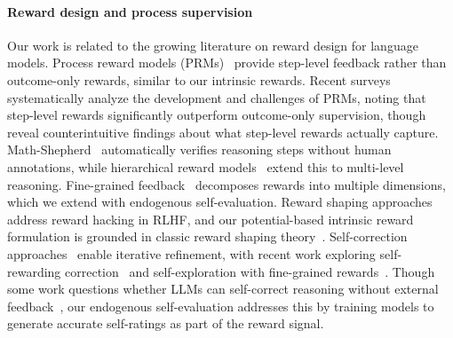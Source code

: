 \documentclass{article}
\theoremstyle{plain}
\theoremstyle{definition}
\theoremstyle{remark}
\begin{document}
\paragraph{Reward design and process supervision} Our work is related to the growing literature on reward design for language models. Process reward models (PRMs)~\citep{lightman2023letsverifystepstep, uesato2022solving, luo2024improve} provide step-level feedback rather than outcome-only rewards, similar to our intrinsic rewards. Recent surveys~\citep{zheng2025prm_survey, zhang2025prm} systematically analyze the development and challenges of PRMs, noting that step-level rewards significantly outperform outcome-only supervision, though~\citet{ma2025stepreward} reveal counterintuitive findings about what step-level rewards actually capture. Math-Shepherd~\citep{wang2024mathshepherd} automatically verifies reasoning steps without human annotations, while hierarchical reward models~\citep{wang2025hierarchical_reward} extend this to multi-level reasoning. Fine-grained feedback~\citep{wu2024finegrained} decomposes rewards into multiple dimensions, which we extend with endogenous self-evaluation. Reward shaping approaches~\citep{fu2025reward_shaping} address reward hacking in RLHF, and our potential-based intrinsic reward formulation is grounded in classic reward shaping theory~\citep{ng1999policy}. Self-correction approaches~\citep{madaan2023selfrefine, shinn2023reflexion, gao2024selfcorrection} enable iterative refinement, with recent work exploring self-rewarding correction~\citep{xiong2025selfrewarding} and self-exploration with fine-grained rewards~\citep{hwang2024selfexplore}. Though some work questions whether LLMs can self-correct reasoning without external feedback~\citep{huang2023large, hong2024self_verification}, our endogenous self-evaluation addresses this by training models to generate accurate self-ratings as part of the reward signal.
\end{document}
